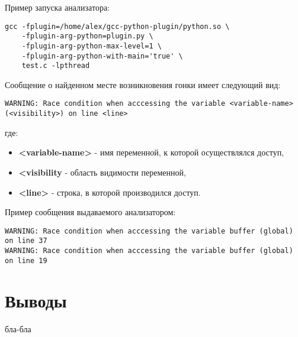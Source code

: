 Пример запуска анализатора:
\begin{verbatim}
gcc -fplugin=/home/alex/gcc-python-plugin/python.so \
    -fplugin-arg-python=plugin.py \
    -fplugin-arg-python-max-level=1 \
    -fplugin-arg-python-with-main='true' \
    test.c -lpthread
\end{verbatim}

Сообщение о найденном месте возникновения гонки имеет следующий вид:
\begin{verbatim}
WARNING: Race condition when acccessing the variable <variable-name> (<visibility>) on line <line>
\end{verbatim}
где:
\begin{itemize}
  \item \textbf{<variable-name>} - имя переменной, к которой осуществлялся доступ,
  \item \textbf{<visibility} - область видимости переменной,
  \item \textbf{<line>} - строка, в которой производился доступ.
\end{itemize}

Пример сообщения выдаваемого анализатором:
\begin{verbatim}
WARNING: Race condition when acccessing the variable buffer (global) on line 37
WARNING: Race condition when acccessing the variable buffer (global) on line 19
\end{verbatim}

\section{Выводы}

бла-бла

